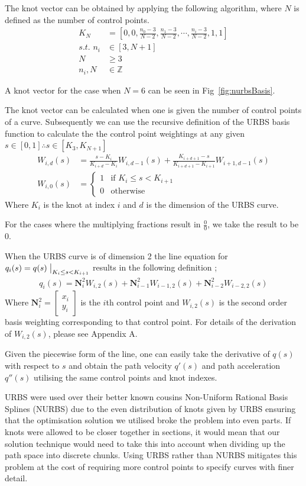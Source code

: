 The knot vector can be obtained by applying the following algorithm, where $N$ is defined as the number of control points.
\begin{align*}
K_N &= \left[0, 0,  \frac{n_0 - 3}{N-2}, \frac{n_1 - 3}{N-2}, \cdots ,\frac{n_i - 3}{N-2}, 1, 1\right]\\  
\textit{s.t. }n_i &\in \left[3, N+1\right]
\\ N &\geq 3
\\n_i, N &\in \mathbb{Z}
\end{align*}

A knot vector for the case when $N = 6$ can be seen in Fig~\ref{fig:nurbsBasis}.

The knot vector can be calculated when one is given the number of control points of a curve. Subsequently we can use the recursive definition of the URBS basis function to calculate the the control point weightings at any given $s \in [0, 1] \therefore s \in [K_3, K_{N+1}]$
\begin{align*}
W_{i,d}(s) &=   \frac{s - K_i}{K_{i+d} - K_i}W_{i,d-1}(s)  +  \frac{K_{i + d + 1} - s}{K_{i + d + 1} - K_{i+1}}W_{i+1,d-1}(s)\\
W_{i,0}(s) &= \begin{cases}
   1 & \text{if } K_i \leq s < K_{i+1} \\
   0 & \text{otherwise}
  \end{cases}
\end{align*}
Where $K_i$ is the knot at index $i$ and $d$ is the dimension of the URBS curve.

For the cases where the multiplying fractions result in $\frac{0}{0}$, we take the result to be $0$.

When the URBS curve is of dimension 2 the line equation for $q_i(s) = q(s)\bigm|_{K_i \leq s < K_{i+1}}$ results in the following definition \cite{website:nurbsExplain};
\begin{align*}
q_i(s) = \textbf{N}_i^2W_{i,2}(s) + \textbf{N}_{i-1}^2W_{i-1,2}(s) + \textbf{N}_{i-2}^2W_{i-2,2}(s)
\end{align*}
Where $\textbf{N}_i^2 = \begin{bmatrix}
x_i\\y_i
\end{bmatrix}$ is the $i$th control point and $W_{i,2}(s)$ is the second order basis weighting corresponding to that control point. 
For details of the derivation of $W_{i,2}(s)$, please see Appendix A.

Given the piecewise form of the line, one can easily take the derivative of $q(s)$ with respect to $s$ and obtain the path velocity $q'(s)$ and path acceleration $q''(s)$ utilising the same control points and knot indexes.
 
URBS were used over their better known cousins Non-Uniform Rational Basis Splines (NURBS) due to the even distribution of knots given by URBS ensuring that the optimisation solution we utilised broke the problem into even parts. If knots were allowed to be closer together in sections, it would mean that our solution technique would need to take this into account when dividing up the path space into discrete chunks. Using URBS rather than NURBS mitigates this problem at the cost of requiring more control points to specify curves with finer detail.
